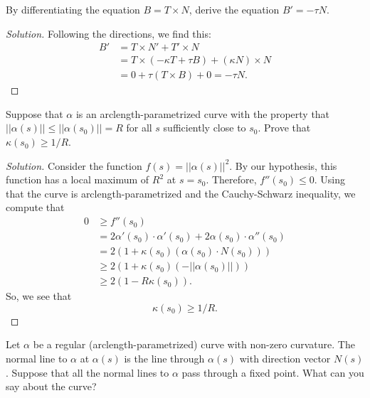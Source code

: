 \documentclass[Shifrin_Solutions_Spring_2018]{subfiles}
\begin{document}
\clearpage


\begin{exercise}
By differentiating the equation $ B = T\times N$, derive the equation $B' = -\tau N$.
\end{exercise}

\begin{proof}[Solution]
Following the directions, we find this:
\[
\begin{split}
B' &= T \times N' + T' \times N \\
& = T \times (-\kappa T + \tau B) + (\kappa N) \times N \\
& = 0 + \tau (T\times B) + 0 = -\tau N.
\end{split}
\]
\end{proof}



\begin{exercise}
Suppose that $\alpha$ is an arclength-parametrized curve with the property that 
$||\alpha(s)|| \leq ||\alpha(s_0)|| =R$ for all $s$ sufficiently close to $s_0$. 
Prove that $\kappa(s_0)\geq 1/R$.
\end{exercise}

\begin{proof}[Solution]
Consider the function $f(s) = ||\alpha(s)||^2$. By our hypothesis, this function 
has a local maximum of $R^2$ at $s = s_0$. Therefore, $f''(s_0) \leq 0$. Using that 
the curve is arclength-parametrized and the Cauchy-Schwarz inequality, we compute that
\[
\begin{split}
0 & \geq f''(s_0)\\
	& = 2 \alpha'(s_0) \cdot \alpha'(s_0) + 2 \alpha(s_0) \cdot \alpha''(s_0) \\
	& = 2 \left( 1 + \kappa(s_0) (\alpha(s_0)\cdot N(s_0)) \right) \\
	& \geq 2 \left( 1 + \kappa(s_0) ( -||\alpha(s_0)||) \right) \\
	& \geq 2 \left( 1 - R \kappa(s_0) \right) .
\end{split}
\]
So, we see that
\[
\kappa(s_0) \geq 1/R .
\]
\end{proof}

\clearpage


\begin{exercise}
Let $\alpha$ be a regular (arclength-parametrized) curve with non-zero curvature. 
The normal line to $\alpha$ at $\alpha(s)$ is the line through $\alpha(s)$ with 
direction vector $N(s)$. Suppose that all the normal lines to $\alpha$ pass through 
a fixed point. What can you say about the curve?
\end{exercise}
\end{document}
